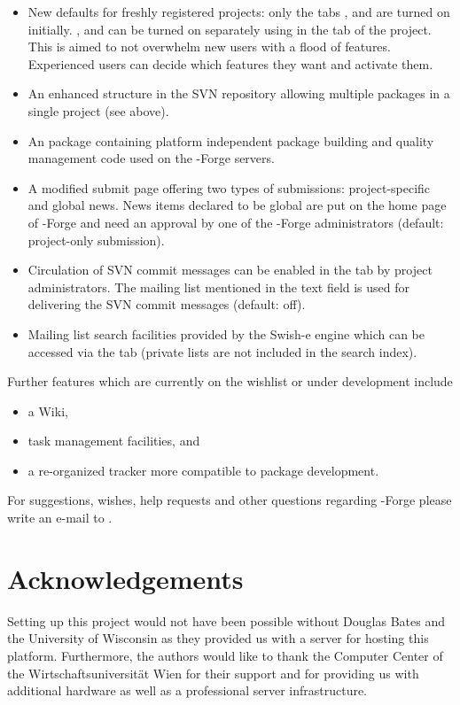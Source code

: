\begin{itemize}
\item New defaults for freshly registered projects: only the tabs
  ,  and  are turned on
  initially. ,  and 
  can be turned on separately using  in
  the  tab of the project. This is aimed to not overwhelm
  new users with a flood of features. Experienced users can decide
  which features they want and activate them.
\item An enhanced structure in the SVN repository allowing multiple
  packages in a single project (see above).
\item An \R{} package \citep[,
  see][]{forge:theussl:2008} containing platform independent package
  building and quality management code used on the \R{}-Forge servers.
\item A modified  submit page offering two types of
  submissions: project-specific and global news. News items
  declared to be global are put on the home page of \R{}-Forge and
  need an approval by one of the \R{}-Forge administrators (default:
  project-only submission).
\item Circulation of SVN commit messages can be enabled in the
   tab by project administrators. The mailing list mentioned in
  the text field is used for delivering the SVN commit messages
  (default: off). 
\item Mailing list search facilities provided by the Swish-e engine
  which can be accessed via the  tab (private lists
  are not included in the search index).

\end{itemize}

Further features which are currently on the wishlist or under
development include 

\begin{itemize}
\item a Wiki,
\item task management facilities, and
\item a re-organized tracker more compatible to \R{} package development. 
\end{itemize}

For suggestions, wishes, help requests and other questions regarding
\R{}-Forge please write an e-mail to .

\section{Acknowledgements}

Setting up this project would not have been possible without Douglas
Bates and the University of Wisconsin as they provided us with a
server for hosting this platform. Furthermore, 
the authors would like to thank the Computer Center 
of the Wirtschaftsuniversit\"at Wien for
their support and for providing us with additional hardware as well as a
professional server infrastructure.

